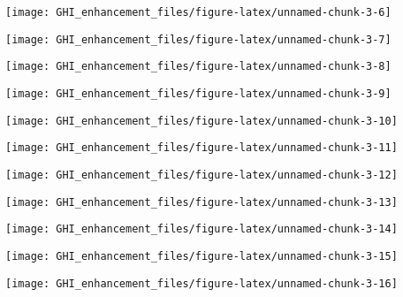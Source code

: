 \documentclass[
  11pt,
  a4paper,oneside]{article}
\begin{document}
\begin{center}\texttt{[image: GHI\_enhancement\_files/figure-latex/unnamed-chunk-3-6]} \end{center}

\begin{center}\texttt{[image: GHI\_enhancement\_files/figure-latex/unnamed-chunk-3-7]} \end{center}

\begin{center}\texttt{[image: GHI\_enhancement\_files/figure-latex/unnamed-chunk-3-8]} \end{center}

\begin{center}\texttt{[image: GHI\_enhancement\_files/figure-latex/unnamed-chunk-3-9]} \end{center}

\begin{center}\texttt{[image: GHI\_enhancement\_files/figure-latex/unnamed-chunk-3-10]} \end{center}

\begin{center}\texttt{[image: GHI\_enhancement\_files/figure-latex/unnamed-chunk-3-11]} \end{center}

\begin{center}\texttt{[image: GHI\_enhancement\_files/figure-latex/unnamed-chunk-3-12]} \end{center}

\begin{center}\texttt{[image: GHI\_enhancement\_files/figure-latex/unnamed-chunk-3-13]} \end{center}

\begin{center}\texttt{[image: GHI\_enhancement\_files/figure-latex/unnamed-chunk-3-14]} \end{center}

\begin{center}\texttt{[image: GHI\_enhancement\_files/figure-latex/unnamed-chunk-3-15]} \end{center}

\begin{center}\texttt{[image: GHI\_enhancement\_files/figure-latex/unnamed-chunk-3-16]} \end{center}
\end{document}
